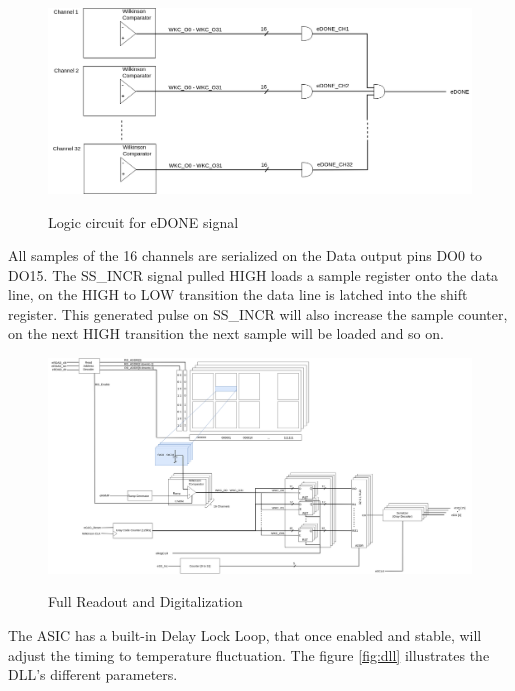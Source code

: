 \begin{figure}[H]
\centering
\includegraphics[width=1\textwidth]{figures/edone.png}\\
\caption{\label{fig:edone} Logic circuit for eDONE signal}
\end{figure}

\noindent
All samples of the 16 channels are serialized on the Data output pins DO0 to DO15. The SS\_INCR signal pulled HIGH loads a sample register onto the data line, on the HIGH to LOW transition the data line is latched into the shift register. This generated pulse on SS\_INCR will also increase the sample counter, on the next HIGH transition the next sample will be loaded and so on.

\newpage
\begin{figure}[H]
\centering
\includegraphics[width=1.3\textwidth, angle = 90]{figures/digit2.png}\\
\caption{\label{fig:digit2} Full Readout and Digitalization}
\end{figure}

\newpage
\noindent
The ASIC has a built-in Delay Lock Loop, that once enabled and stable, will adjust the timing to temperature fluctuation. The figure \ref{fig:dll} illustrates the DLL's different parameters.

